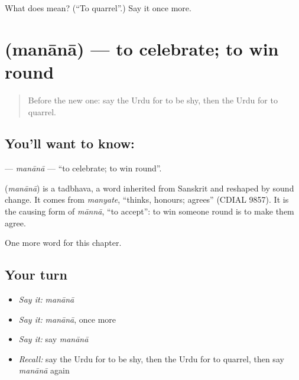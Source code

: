 \begin{tcolorbox}[breakable,colback=teal!4,colframe=teal!35!black,title={Before you move on}]
What does  mean? (\textquotedblleft{}To quarrel\textquotedblright{}.) Say it once more.
\end{tcolorbox}
\section[\texorpdfstring{\ur{منانا} (manānā)}{منانا (manānā)}]{ (manānā) — to celebrate; to win round}

\label{lesson:UR-C180-manana}



\begin{quote}
Before the new one: say the Urdu for to be shy, then the Urdu for to quarrel.
\end{quote}

\subsection*{You'll want to know: }
\textbf{} — \emph{manānā} — \textquotedblleft{}to celebrate; to win round\textquotedblright{}.

\begin{cousinweb}
\textbf{} (\emph{manānā}) is a tadbhava, a word inherited from Sanskrit and reshaped by sound change. It comes from \emph{manyate}, \textquotedblleft{}thinks, honours; agrees\textquotedblright{} (CDIAL 9857). It is the causing form of \emph{mānnā}, \textquotedblleft{}to accept\textquotedblright{}: to win someone round is to make them agree.
\end{cousinweb}

\begin{grammarlens}[title={What you've built}]
One more word for this chapter.
\end{grammarlens}

\subsection*{Your turn}
\begin{itemize}
\raggedright
  \item \emph{Say it:} \emph{manānā}
  \item \emph{Say it:} \emph{manānā}, once more
  \item \emph{Say it:} say \emph{manānā}
  \item \emph{Recall:} say the Urdu for to be shy, then the Urdu for to quarrel, then say \emph{manānā} again
\end{itemize}

